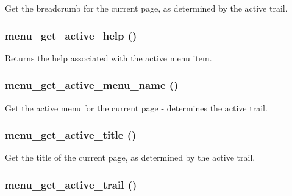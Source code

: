 Get the breadcrumb for the current page, as determined by the active trail. \hypertarget{group__menu_g21c6572391132f4e1f5b3fd108220bf4}{
\subsubsection[{menu\_\-get\_\-active\_\-help}]{\setlength{\rightskip}{0pt plus 5cm}menu\_\-get\_\-active\_\-help ()}}
\label{group__menu_g21c6572391132f4e1f5b3fd108220bf4}


Returns the help associated with the active menu item. \hypertarget{group__menu_g7f449034a05c47e985f5ce8ec31344e2}{
\subsubsection[{menu\_\-get\_\-active\_\-menu\_\-name}]{\setlength{\rightskip}{0pt plus 5cm}menu\_\-get\_\-active\_\-menu\_\-name ()}}
\label{group__menu_g7f449034a05c47e985f5ce8ec31344e2}


Get the active menu for the current page - determines the active trail. \hypertarget{group__menu_gf0a358447097959e53ad1a20b8d811ed}{
\subsubsection[{menu\_\-get\_\-active\_\-title}]{\setlength{\rightskip}{0pt plus 5cm}menu\_\-get\_\-active\_\-title ()}}
\label{group__menu_gf0a358447097959e53ad1a20b8d811ed}


Get the title of the current page, as determined by the active trail. \hypertarget{group__menu_g55105d602c5c5ea5b39aae25aa47f8c5}{
\subsubsection[{menu\_\-get\_\-active\_\-trail}]{\setlength{\rightskip}{0pt plus 5cm}menu\_\-get\_\-active\_\-trail ()}}
\label{group__menu_g55105d602c5c5ea5b39aae25aa47f8c5}


